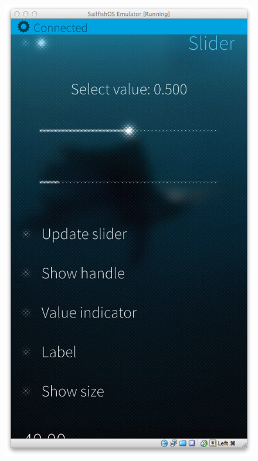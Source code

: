 \begin{figure}[H]
{  \includegraphics[scale=0.3]{../media/gfx/silica/silica06.png}
  \label{fig:silica06}
}
\end{figure}
%
